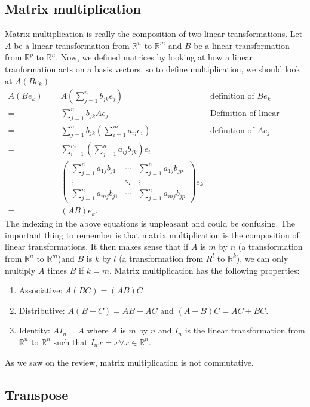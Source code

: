 \documentclass[12pt,reqno]{amsart}
\def\R{\mathbb{R}}
\theoremstyle{definition}
\begin{document}
\subsection{Matrix multiplication}
Matrix multiplication is really the composition of two linear
transformations. Let $A$ be a linear transformation from $\R^n$ to
$\R^m$ and $B$ be a linear transformation from $\R^p$ to $\R^n$. Now,
we defined matrices by looking at how a linear tranformation acts on a
basis vectors, so to define multiplication, we should look at $A(B
e_k)$
\begin{align*}
  A(B e_k) = & A (\sum_{j=1}^n b_{jk} e_j) & \text{definition of $Be_k$}\\
  = & \sum_{j=1}^n b_{jk} A e_j & \text{Definition of linear
    transformtion} \\
  = & \sum_{j=1}^n b_{jk} \left(\sum_{i=1}^m a_{ij} e_i\right)  &
  \text{definition of $Ae_j$} \\
  = & \sum_{i=1}^m \left(\sum_{j=1}^n a_{ij} b_{jk} \right) e_i \\
  = & \begin{pmatrix} 
    \sum_{j=1}^n a_{1j} b_{j1} & \cdots & \sum_{j=1}^n a_{1j} b_{jp} \\
    \vdots & \ddots & \vdots \\
    \sum_{j=1}^n a_{mj} b_{j1} & \cdots & \sum_{j=1}^n a_{mj} b_{jp}
  \end{pmatrix} e_k  \\
  = & (AB)e_k .
\end{align*}
The indexing in the above equations is unpleasant and could be
confusing. The important thing to remember is that matrix
multiplication is the composition of linear transformations. It then
makes sense that if $A$ is $m$ by $n$ (a transformation from $\R^n$ to
$\R^m$)and $B$ is $k$ by $l$ (a transformation from $R^l$ to $\R^k$),
we can only multiply $A$ times $B$ if $k = m$. Matrix multiplication
has the following properties:
\begin{enumerate}
\item Associative: $A(BC) = (AB) C$
\item Distributive: $A(B+C) = AB + AC$ and $(A+B)C = AC + BC$. 
\item Identity: $AI_n = A$ where $A$ is $m$ by $n$ and $I_n$ is the linear
  transformation from $\R^n$ to $\R^n$ such that $I_nx = x \forall x \in
  \R^n$.
\end{enumerate}
As we saw on the review, matrix multiplication is not commutative. 

\subsection{Transpose}
\end{document}
